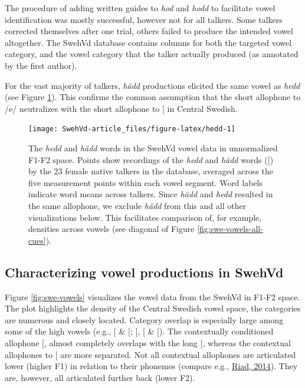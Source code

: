 \documentclass[utf8]{frontiersSCNS}
\begin{document}
The procedure of adding written guides to \emph{hod} and \emph{hodd} to facilitate vowel identification was mostly successful, however not for all talkers. Some talkers corrected themselves after one trial, others failed to produce the intended vowel altogether. The SwehVd database contains columns for both the targeted vowel category, and the vowel category that the talker actually produced (as annotated by the first author).

For the vast majority of talkers, \emph{hädd} productions elicited the same vowel as \emph{hedd} (see Figure \ref{fig:hedd}). This confirms the common assumption that the short allophone to /e/ neutralizes with the short allophone to {[}\ipatext{ɛ}{]} in Central Swedish.



\begin{figure}

{\centering \texttt{[image: SwehVd-article\_files/figure-latex/hedd-1]} 

}

\caption{The \emph{hedd} and \emph{hädd} words in the SwehVd vowel data in unnormalized F1-F2 space. Points show recordings of the \emph{hedd} and \emph{hädd} words ({[}\ipatext{ɛ}{]}) by the 23 female native talkers in the database, averaged across the five measurement points within each vowel segment. Word labels indicate word means across talkers. Since \emph{hädd} and \emph{hedd} resulted in the same allophone, we exclude \emph{hädd} from this and all other visualizations below. This facilitates comparison of, for example, densities across vowels (see diagonal of Figure \ref{fig:swe-vowels-all-cues}).}\label{fig:hedd}
\end{figure}

\hypertarget{sec:characterizing-swehvd}{%
\subsection*{Characterizing vowel productions in SwehVd}\label{sec:characterizing-swehvd}}

Figure \ref{fig:swe-vowels} visualizes the vowel data from the SwehVd in F1-F2 space. The plot highlights the density of the Central Swedish vowel space, the categories are numerous and closely located. Category overlap is especially large among some of the high vowels (e.g., {[}\ipatext{iː}{]} \& {[}\ipatext{yː}{]}; {[}\ipatext{uː}{]}, {[}\ipatext{oː}{]} \& {[}\ipatext{ʊ}{]}). The contextually conditioned allophone {[}\ipatext{æ}{]}, almost completely overlaps with the long {[}\ipatext{ɛː}{]}, whereas the contextual allophones to {[}\ipatext{ø}{]} are more separated. Not all contextual allophones are articulated lower (higher F1) in relation to their phonemes (compare e.g., \protect\hyperlink{ref-riad2014}{Riad, 2014}). They are, however, all articulated further back (lower F2).
\end{document}
